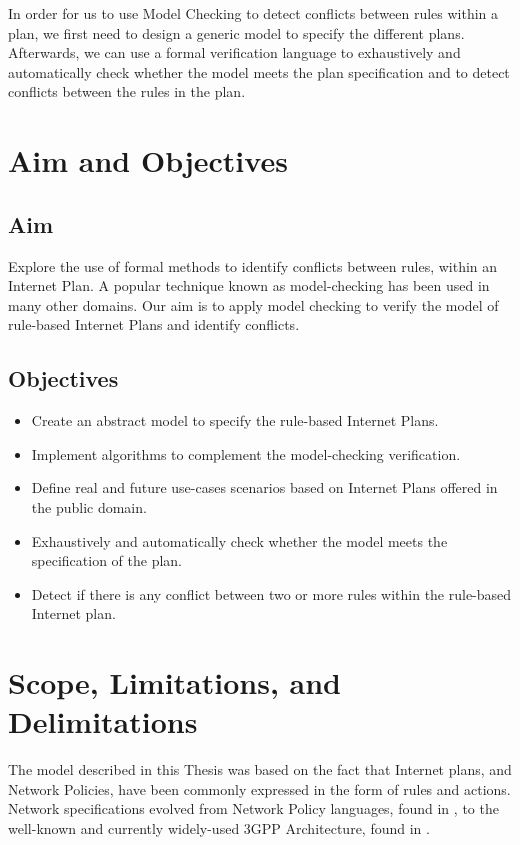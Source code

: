 In order for us to use Model Checking to detect conflicts between rules within a plan, we first need to design a generic model to specify the different plans. Afterwards, we can use a formal verification language to exhaustively and automatically check whether the model meets the plan specification and to detect conflicts between the rules in the plan. 

\section{Aim and Objectives}
\subsection{Aim}
\noindent
Explore the use of formal methods to identify conflicts between rules, within an Internet Plan. A popular technique known as model-checking has been used in many other domains. Our aim is to apply model checking to verify the model of rule-based Internet Plans and identify conflicts.  

\subsection{Objectives}
\noindent
\begin{itemize}
\item Create an abstract model to specify the rule-based Internet Plans.
 
\item Implement algorithms to complement the model-checking verification.

\item Define real and future use-cases scenarios based on Internet Plans offered in the public domain. 

\item Exhaustively and automatically check whether the model meets the specification of the plan.

\item Detect if there is any conflict between two or more rules within the rule-based Internet plan. 

\end{itemize}

\section{Scope, Limitations, and Delimitations}
\noindent
The model described in this Thesis was based on the fact that Internet plans, and Network Policies, have been commonly expressed in the form of rules and actions. Network specifications evolved from Network Policy languages, found in \cite{rfc1102,Sloman1999,Stone2001}, to the well-known and currently widely-used 3GPP Architecture, found in \cite{Albaladejo2008,Grgic2013}. \\

